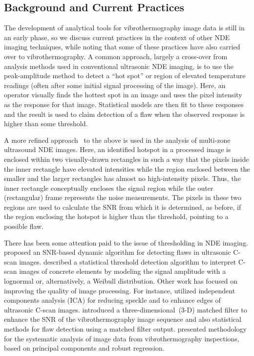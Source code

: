 \documentclass[12pt]{article}
\begin{document}
\subsection{Background and Current Practices}
\label{background}
The development of analytical tools for vibrothermography image data
is still in an early phase, so we discuss current practices in the
context of other NDE imaging techniques, while noting that some of these
practices  have also carried over to vibrothermography. A common
approach, largely a cross-over from analysis methods used in
conventional ultrasonic NDE 
imaging, is to use the peak-amplitude method to detect a ``hot spot''
or region of elevated temperature readings (often after some initial
signal processing of the image). 
Here, an operator
visually finds the  hottest spot in an image and uses the pixel
intensity as the response for that image. Statistical models are then
fit to these responses and the result is used to claim detection of a
flaw when the observed response is higher than some threshold.   

A more refined approach~\citep{howardandgilmore94} to the above is
used in the analysis of  multi-zone ultrasound NDE images. Here, an
identified hotspot in a processed image is enclosed within two
visually-drawn rectangles in  
such a way that the pixels inside the inner rectangle have elevated
intensities while the region enclosed between the smaller and the larger
rectangles has  almost no high-intensity pixels. Thus, the 
inner rectangle conceptually encloses the signal region while the
outer (rectangular) frame represents the noise measurements. The pixels
in these two regions are used to calculate the SNR from which it is  
determined, as before, if the region enclosing the hotspot is higher
than the threshold, pointing to a possible flaw. 

There has been some attention paid to the issue of thresholding in NDE
imaging. \citet{howardetal98} proposed an SNR-based dynamic %
algorithm for detecting flaws in ultrasonic C-scan images. 
\citet{jansohnandschikert98}  described a statistical threshold
detection algorithm to interpret C-scan images of concrete 
elements by modeling the signal amplitude with a lognormal or,
alternatively, a Weibull distribution. Other work has focused on
improving the quality of image processing. For instance, 
\citet{chenandwang04} utilized independent components analysis (ICA)
for reducing speckle and to enhance edges of ultrasonic C-scan
images. \citet{lietal10} introduced  a three-dimensional~(3-D) matched
filter to enhance the SNR of the vibrothermography image sequence  and
also statistical methods for flaw detection using a matched filter
output. \citet{gaoandmeeker12} presented methodology for the
systematic analysis of image data from vibrothermography inspections,
based on principal components and  robust regression. 
\end{document}
